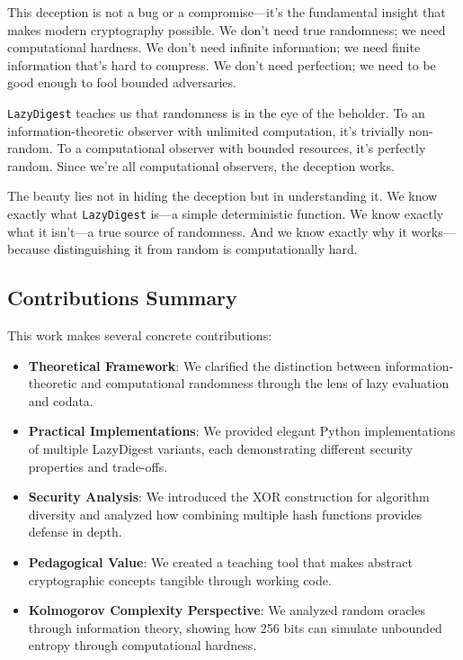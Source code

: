 \documentclass[11pt]{article}
\begin{document}
This deception is not a bug or a compromise---it's the fundamental insight that makes modern cryptography possible. We don't need true randomness; we need computational hardness. We don't need infinite information; we need finite information that's hard to compress. We don't need perfection; we need to be good enough to fool bounded adversaries.

\texttt{LazyDigest} teaches us that randomness is in the eye of the beholder. To an information-theoretic observer with unlimited computation, it's trivially non-random. To a computational observer with bounded resources, it's perfectly random. Since we're all computational observers, the deception works.

The beauty lies not in hiding the deception but in understanding it. We know exactly what \texttt{LazyDigest} is---a simple deterministic function. We know exactly what it isn't---a true source of randomness. And we know exactly why it works---because distinguishing it from random is computationally hard.

\subsection{Contributions Summary}

This work makes several concrete contributions:

\begin{itemize}
\item \textbf{Theoretical Framework}: We clarified the distinction between information-theoretic and computational randomness through the lens of lazy evaluation and codata.
\item \textbf{Practical Implementations}: We provided elegant Python implementations of multiple LazyDigest variants, each demonstrating different security properties and trade-offs.
\item \textbf{Security Analysis}: We introduced the XOR construction for algorithm diversity and analyzed how combining multiple hash functions provides defense in depth.
\item \textbf{Pedagogical Value}: We created a teaching tool that makes abstract cryptographic concepts tangible through working code.
\item \textbf{Kolmogorov Complexity Perspective}: We analyzed random oracles through information theory, showing how 256 bits can simulate unbounded entropy through computational hardness.
\end{itemize}
\end{document}
